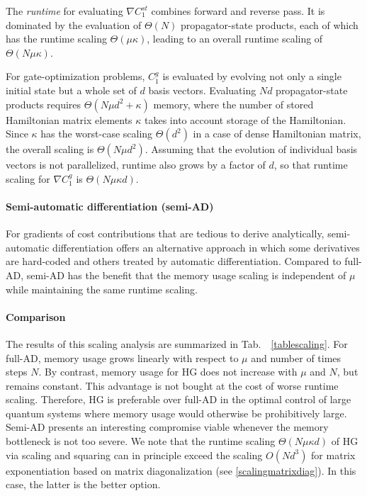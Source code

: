 The \textit{runtime} for evaluating $\nabla C_1^{st}$ combines forward and reverse pass. It is dominated by the evaluation of $\Theta(N)$ propagator-state products, each of which has the runtime scaling $\Theta(\mu\kappa)$, leading to an overall runtime scaling of $\Theta(N\mu \kappa )$.

For gate-optimization problems, $C_1^{ g}$ is evaluated by evolving not only a single initial state but a whole set of $d$ basis vectors. Evaluating $Nd$ propagator-state products requires $\Theta(N\mu d^2+\kappa)$ memory, where the number of stored Hamiltonian matrix elements  $\kappa$ takes into account storage of the Hamiltonian. Since $\kappa$ has the worst-case scaling $\Theta(d^2)$ in a case of dense Hamiltonian matrix, the overall scaling is $\Theta(N\mu d^2)$. Assuming that the evolution of individual basis vectors is not parallelized, runtime also grows by a factor of $d$, so that runtime scaling for $\nabla C_1^{ g}$ is $\Theta(N\mu\kappa d)$.

\paragraph{Semi-automatic differentiation (semi-AD)}
For gradients of cost contributions that are tedious to derive analytically, semi-automatic differentiation \cite{semiadgoerz2022quantum} offers an alternative approach in which some derivatives are hard-coded and others treated by automatic differentiation. Compared to full-AD, semi-AD has the benefit that the memory usage scaling is independent of $\mu$ while maintaining the same runtime scaling. 

\paragraph{Comparison}
The results of this scaling analysis are summarized in Tab.\ \ \ref{tablescaling}. For full-AD, memory usage grows linearly with respect to $\mu$ and number of times steps $N$. By contrast, memory usage for HG does not increase with $\mu$ and $N$, but remains constant. This advantage is not bought at the cost of worse runtime scaling. Therefore, HG is preferable over full-AD in the optimal control of large quantum systems where memory usage would otherwise be prohibitively large. Semi-AD presents an interesting compromise viable whenever the memory bottleneck is not too severe. We note that the runtime scaling $\Theta(N\mu\kappa d)$ of HG via scaling and squaring can in principle exceed the scaling $O(Nd^3)$ for matrix exponentiation based on matrix diagonalization (see  \ref{scalingmatrixdiag}). In this case, the latter is the better option.

